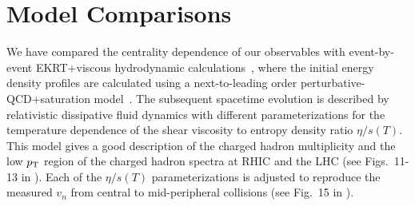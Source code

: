 \section{Model Comparisons}
\label{sec:theory}
We have compared the centrality dependence of our observables with event-by-event EKRT+viscous hydrodynamic calculations~\cite{Niemi:2015qia}, where the initial energy density profiles are calculated using a next-to-leading order perturbative-QCD+saturation model~\cite{Paatelainen:2012at,Paatelainen:2013eea}. The subsequent spacetime evolution is described by relativistic dissipative fluid dynamics with different parameterizations for the temperature dependence of the shear viscosity to entropy density ratio $\eta/s(T)$. 
This model gives a good description of the charged hadron multiplicity and the low $p_{\rm T}$ region of the charged hadron spectra at RHIC and the LHC (see Figs.~11-13 in \cite{Niemi:2015qia}).
Each of the $\eta/s(T)$ parameterizations is adjusted to reproduce the measured $v_n$ from central to mid-peripheral collisions (see Fig.~15 in \cite{Niemi:2015qia}). 

